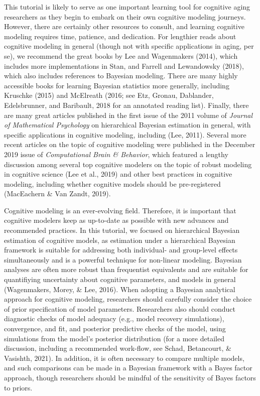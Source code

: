 \documentclass[
  english,
  ,man,floatsintext]{apa6}
\begin{document}
This tutorial is likely to serve as one important learning tool for cognitive aging researchers as they begin to embark on their own cognitive modeling journeys. However, there are certainly other resources to consult, and learning cognitive modeling requires time, patience, and dedication. For lengthier reads about cognitive modeling in general (though not with specific applications in aging, per se), we recommend the great books by Lee and Wagenmakers (2014), which includes more implementations in Stan, and Farrell and Lewandowsky (2018), which also includes references to Bayesian modeling. There are many highly accessible books for learning Bayesian statistics more generally, including Kruschke (2015) and McElreath (2016; see Etz, Gronau, Dablander, Edelsbrunner, and Baribault, 2018 for an annotated reading list). Finally, there are many great articles published in the first issue of the 2011 volume of \emph{Journal of Mathematical Psychology} on hierarchical Bayesian estimation in general, with specific applications in cognitive modeling, including (Lee, 2011). Several more recent articles on the topic of cognitive modeling were published in the December 2019 issue of \emph{Computational Brain \& Behavior}, which featured a lengthy discussion among several top cognitive modelers on the topic of robust modeling in cognitive science (Lee et al., 2019) and other best practices in cognitive modeling, including whether cognitive models should be pre-registered (MacEachern \& Van Zandt, 2019).

Cognitive modeling is an ever-evolving field. Therefore, it is important that cognitive modelers keep as up-to-date as possible with new advances and recommended practices. In this tutorial, we focused on hierarchical Bayesian estimation of cognitive models, as estimation under a hierarchical Bayesian framework is suitable for addressing both individual- and group-level effects simultaneously and is a powerful technique for non-linear modeling. Bayesian analyses are often more robust than frequentist equivalents and are suitable for quantifiying uncertainty about cognitive parameters, and models in general (Wagenmakers, Morey, \& Lee, 2016). When adopting a Bayesian analytical approach for cognitive modeling, researchers should carefully consider the choice of prior specification of model parameters. Researchers also should conduct diagnostic checks of model adequacy (e.g., model recovery simulations), convergence, and fit, and posterior predictive checks of the model, using simulations from the model's posterior distribution (for a more detailed discussion, including a recommended work-flow, see Schad, Betancourt, \& Vasishth, 2021). In addition, it is often necessary to compare multiple models, and such comparisons can be made in a Bayesian framework with a Bayes factor approach, though researchers should be mindful of the sensitivity of Bayes factors to priors.
\end{document}
